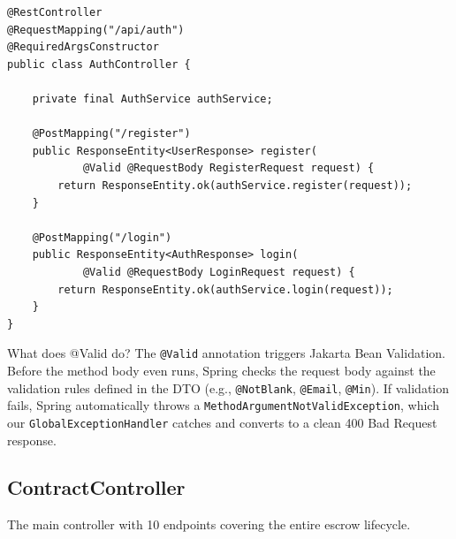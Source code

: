\documentclass[11pt, a4paper]{article}
\begin{document}
\begin{lstlisting}[caption={AuthController.java}]
@RestController
@RequestMapping("/api/auth")
@RequiredArgsConstructor
public class AuthController {

    private final AuthService authService;

    @PostMapping("/register")
    public ResponseEntity<UserResponse> register(
            @Valid @RequestBody RegisterRequest request) {
        return ResponseEntity.ok(authService.register(request));
    }

    @PostMapping("/login")
    public ResponseEntity<AuthResponse> login(
            @Valid @RequestBody LoginRequest request) {
        return ResponseEntity.ok(authService.login(request));
    }
}
\end{lstlisting}

\begin{conceptbox}{What does @Valid do?}
The \texttt{@Valid} annotation triggers Jakarta Bean Validation. Before the method body even runs, Spring checks the request body against the validation rules defined in the DTO (e.g., \texttt{@NotBlank}, \texttt{@Email}, \texttt{@Min}). If validation fails, Spring automatically throws a \texttt{MethodArgumentNotValidException}, which our \texttt{GlobalExceptionHandler} catches and converts to a clean 400 Bad Request response.
\end{conceptbox}

\subsection{ContractController}

The main controller with 10 endpoints covering the entire escrow lifecycle.
\end{document}
